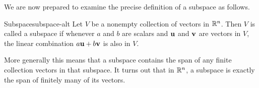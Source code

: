 We are now prepared to examine the precise definition of a subspace as
follows.

\begin{definition}{Subspace}{subspace-alt}
  Let $V$ be a nonempty collection of vectors in $\mathbb{R}^{n}$. Then $V$ is
  called a subspace if whenever $a$
  and $b$ are scalars and $\mbox{\bf u}$ and $\mbox{\bf v}$ are vectors in
  $V$, the linear combination $a \mbox{\bf u}+ b \mbox{\bf v}$ is also in $V$.
\end{definition}

More generally this means that a subspace contains the span of any
finite collection vectors in that subspace. It turns out that in
$\mathbb{R}^{n}$, a subspace is exactly the span of finitely many of its
vectors.


